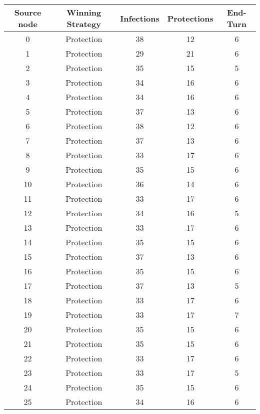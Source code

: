\documentclass[results.tex]{subfiles}
\begin{document}
\begin{center}
  \begin{tabular}{| c || c | c | c | c |}
    \hline
    {\bfseries Source node} & {\bfseries Winning Strategy} & {\bfseries Infections} & {\bfseries Protections} & {\bfseries End-Turn} \\  %
    \hline\hline
    0 & Protection & 38 & 12 & 6 \\ 
    \hline
    1 & Protection & 29 & 21 & 6 \\ 
    \hline
    2 & Protection & 35 & 15 & 5 \\ 
    \hline
    3 & Protection & 34 & 16 & 6 \\ 
    \hline
    4 & Protection & 34 & 16 & 6 \\ 
    \hline
    5 & Protection & 37 & 13 & 6 \\ 
    \hline
    6 & Protection & 38 & 12 & 6 \\ 
    \hline
    7 & Protection & 37 & 13 & 6 \\ 
    \hline
    8 & Protection & 33 & 17 & 6 \\ 
    \hline
    9 & Protection & 35 & 15 & 6 \\ 
    \hline
    10 & Protection & 36 & 14 & 6 \\ 
    \hline
    11 & Protection & 33 & 17 & 6 \\ 
    \hline
    12 & Protection & 34 & 16 & 5 \\ 
    \hline
    13 & Protection & 33 & 17 & 6 \\ 
    \hline
    14 & Protection & 35 & 15 & 6 \\ 
    \hline
    15 & Protection & 37 & 13 & 6 \\ 
    \hline
    16 & Protection & 35 & 15 & 6 \\ 
    \hline
    17 & Protection & 37 & 13 & 5 \\ 
    \hline
    18 & Protection & 33 & 17 & 6 \\ 
    \hline
    19 & Protection & 33 & 17 & 7 \\ 
    \hline
    20 & Protection & 35 & 15 & 6 \\ 
    \hline
    21 & Protection & 35 & 15 & 6 \\ 
    \hline
    22 & Protection & 33 & 17 & 6 \\ 
    \hline
    23 & Protection & 33 & 17 & 5 \\ 
    \hline
    24 & Protection & 35 & 15 & 6 \\ 
    \hline
    25 & Protection & 34 & 16 & 6 \\ 

\end{tabular}
\end{center}
\end{document}
